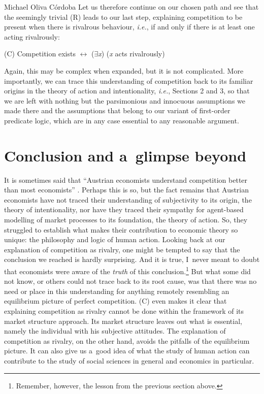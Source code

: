 \begin{artengenv}{Michael Oliva Córdoba}
Let us therefore continue on our chosen path and see that the seemingly trivial (R) leads to our last step, explaining competition to be present when there is rivalrous behaviour, \textit{i.e.}, if and only if there is at least one acting rivalrously:



\medskip

\noindent (C) Competition exists $\leftrightarrow$ (${\exists}$\textit{x}) (\textit{x} acts rivalrously)



\medskip

\noindent Again, this may be complex when expanded, but it is not complicated. More importantly, we can trace this understanding of competition back to its familiar origins in the theory of action and intentionality, \textit{i.e.}, Sections 2 and 3, so that we are left with nothing but the parsimonious and innocuous assumptions we made there and the assumptions that belong to our variant of first-order predicate logic, which are in any case essential to any reasonable argument.



\section{Conclusion and a~glimpse beyond}

It is sometimes said that ``Austrian economists understand competition better than most economists'' 
\parencite[][p.142]{nell_competition_2010}. %
 Perhaps this is so, but the fact remains that Austrian economists have not traced their understanding of subjectivity to its origin, the theory of intentionality, nor have they traced their sympathy for agent-based modelling of market processes to its foundation, the theory of action. So, they struggled to establish what makes their contribution to economic theory so unique: the philosophy and logic of human action. Looking back at our explanation of competition as rivalry, one might be tempted to say that the conclusion we reached is hardly surprising. And it is true, I~never meant to doubt that economists were aware of the \textit{truth} of this conclusion.\footnote{Remember, however, the lesson from the previous section above.} But what some did not know, or others could not trace back to its root cause, was that there was no need or place in this understanding for anything remotely resembling an equilibrium picture of perfect competition. (C) even makes it clear that explaining competition as rivalry cannot be done within the framework of its market structure approach. Its market structure leaves out what is essential, namely the individual with his subjective attitudes. The explanation of competition as rivalry, on the other hand, avoids the pitfalls of the equilibrium picture. It can also give us a~good idea of what the study of human action can contribute to the study of social sciences in general and economics in particular.




\end{artengenv}
